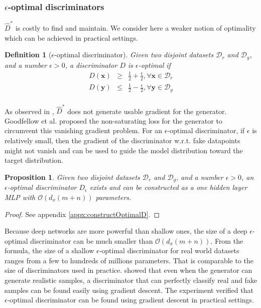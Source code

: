 \documentclass{article} %
\newtheorem{definition}{Definition}
\newtheorem{proposition}{Proposition}
\begin{document}
\subsubsection{$\epsilon$-optimal discriminators}
$\hat{D}^*$ is costly to find and maintain. 
We consider here a weaker notion of optimality which can be achieved in practical settings.
\begin{definition}[$\epsilon$-optimal discriminator]
\label{def:epsOptimD}
Given two disjoint datasets $\mathcal{D}_r$ and $\mathcal{D}_g$, and a number $\epsilon > 0$, a discriminator $D$ is $\epsilon$-optimal if 
\begin{eqnarray*}
D(\bm x) & \ge & \frac{1}{2} + \frac{\epsilon}{2}, \forall \bm x \in \mathcal{D}_r \\
D(\bm y) & \le & \frac{1}{2} - \frac{\epsilon}{2}, \forall \bm y \in \mathcal{D}_g \\
\end{eqnarray*}
\end{definition}
As observed in \cite{gan}, $\hat{D}^*$ does not generate usable gradient for the generator. Goodfellow et al. proposed the non-saturating loss for the generator to circumvent this vanishing gradient problem. For an $\epsilon$-optimal discriminator, if $\epsilon$ is relatively small, then the gradient of the discriminator w.r.t. fake datapoints might not vanish and can be used to guide the model distribution toward the target distribution. 
\begin{proposition}
Given two disjoint datasets $\mathcal{D}_r$ and $\mathcal{D}_g$, and a number $\epsilon > 0$, an $\epsilon$-optimal discriminator $D_{\epsilon}$ exists and can be constructed as a one hidden layer MLP with $\mathcal{O}(d_x(m + n))$ parameters. \label{prop:optimD}
\end{proposition}
\begin{proof}
See appendix \ref{appx:constructOptimalD}. 
\end{proof}
Because deep networks are more powerful than shallow ones, the size of a deep $\epsilon$-optimal discriminator can be much smaller than $\mathcal{O}(d_x(m + n))$.
From the formula, the size of a shallow $\epsilon$-optimal discriminator for real world datasets ranges from a few to hundreds of millions parameters. That is comparable to the size of discriminators used in practice. \cite{towardPrincipledGAN} showed that even when the generator can generate realistic samples, a discriminator that can perfectly classify real and fake samples can be found easily using gradient descent. The experiment verified that $\epsilon$-optimal discriminator can be found using gradient descent in practical settings.
\end{document}
